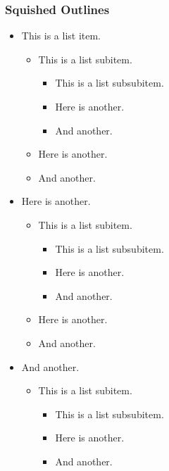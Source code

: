 \begin{frame}\frametitle{Squished Outlines}

\begin{itemize}
    \item This is a list item.
    \begin{itemize}
        \item This is a list subitem.
        \begin{itemize}
            \item This is a list subsubitem.
            \item Here is another.
            \item And another.
        \end{itemize}
        \item Here is another.
        \item And another.
    \end{itemize}
    \item Here is another.
    \begin{itemize}
        \item This is a list subitem.
        \begin{itemize}
            \item This is a list subsubitem.
            \item Here is another.
            \item And another.
        \end{itemize}
        \item Here is another.
        \item And another.
    \end{itemize}
    \item And another.
    \begin{itemize}
        \item This is a list subitem.
        \begin{itemize}
            \item This is a list subsubitem.
            \item Here is another.
            \item And another.
        \end{itemize}
    \end{itemize}
\end{itemize}

\end{frame}


